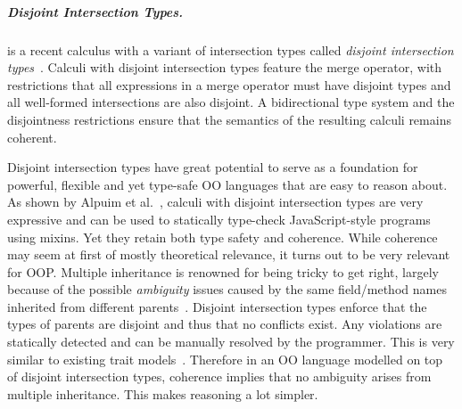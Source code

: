 \subparagraph{Disjoint Intersection Types.}
\oname is a recent calculus with a variant of intersection types 
called \emph{disjoint intersection types}~\cite{oliveira2016disjoint}.
Calculi with disjoint intersection types feature the merge 
operator, with restrictions that all expressions in a merge 
operator must have disjoint types and all well-formed intersections 
are also disjoint. A bidirectional type system and the disjointness restrictions 
ensure that the semantics of the resulting calculi remains 
coherent. 

\begin{comment}
The merge operator was introduced by Reynolds 
and Forsythe and adopted by a few other calculi as well~\cite{}.
Unfortunately, while the merge operator is powerful, it makes 
it hard to get a \emph{coherent} semantics. \bruno{what is coherence}
Perhaps because 
of this issue the merge operator has not been adopted by 
many language designs. Disjoint intersection types provide 
a remedy for the coherence problem, by imposing restrictions 
on the uses of merges and on the formation of intersection types. 
\bruno{merge operator ==> models inheritance; intersection types ==> 
model subtyping}

In essence disjoint intersection types retain most of the 
expressive power of the merge operator.
For example, they can 
be used to model powerful forms of extensible records~\cite{}.
\end{comment}

Disjoint intersection types have great potential to serve as a foundation for
powerful, flexible and yet type-safe OO languages that are easy to reason
about. As shown by Alpuim et al.~\cite{alpuimdisjoint}, calculi with disjoint intersection
types are very
expressive and can be used to statically type-check JavaScript-style programs
using mixins. Yet they retain both type safety and coherence. While
coherence may seem at first of mostly theoretical relevance, it
turns out to be very relevant for OOP. Multiple
inheritance is renowned for being tricky to get right, largely because of the
possible \emph{ambiguity} issues caused by the same field/method names
inherited from different parents~\cite{bracha1990mixin, scharli2003traits}. Disjoint intersection types
enforce that the types of parents are disjoint and thus that no conflicts exist.
Any violations are statically detected and can be manually resolved by the
programmer.
This is very similar
to existing trait models~\cite{fisher2004typed,
  ducasse2006traits}. Therefore in an OO language
modelled on top of disjoint intersection types, coherence implies
that no ambiguity arises from multiple inheritance. This makes
reasoning a lot simpler.

